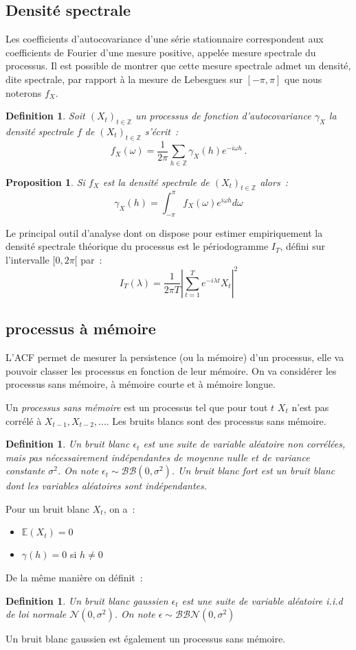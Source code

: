 \documentclass[11pt]{scrartcl} %
\newtheorem{Def}[theorem]{Definition}
\newtheorem{pro}[theorem]{Proposition}
\newcommand{\Xt}{\left(X_t\right)_{t\in\mathbb{Z}}}
\newcommand{\E}[1]{\mathbb{E}\left(#1\right)}
\newcommand{\bb}[1]{\mathcal{BB}\left(0,#1\right)}
\newcommand{\bbn}[1]{\mathcal{BBN}\left(0,#1\right)}
\begin{document}
\subsection{Densité spectrale}
Les coefficients d'autocovariance d'une série stationnaire correspondent aux coefficients de Fourier d'une mesure positive, appelée mesure spectrale du processus. Il est possible de montrer que cette mesure spectrale admet un densité, dite spectrale, par rapport à la mesure de Lebesgues sur $[-\pi,\pi]$ que nous noterons $f_X$.
\begin{Def}
Soit $\Xt$ un processus de fonction d'autocovariance $\gamma_X$ la densité spectrale $f$ de $\Xt$ s'écrit~:
$$
f_X(\omega) = \frac{1}{2\pi}\sum_{h\in\mathbb{Z}}\gamma_X(h)e^{-i\omega h}\,.
$$
\end{Def}
\begin{pro}
Si $f_X$ est la densité spectrale de $\Xt$ alors~:
$$
\gamma_X(h)=\int_{-\pi}^{\pi}f_X(\omega)e^{i\omega h}d\omega
$$
\end{pro}
Le principal outil d'analyse dont on dispose pour estimer empiriquement la densité spectrale théorique du processus est le périodogramme $I_T$, défini sur l'intervalle $[0,2\pi[$ par~:
$$
I_T(\lambda)=\frac{1}{2\pi T}\left|\sum_{t=1}^Te^{-i\lambda t}X_t\right|^2
$$

\subsection{processus à mémoire}
L'ACF permet de mesurer la persistence (ou la mémoire) d'un processus, elle va pouvoir classer les processus en fonction de leur mémoire. On va considérer les processus sans mémoire, à mémoire courte et à mémoire longue.


Un \textit{processus sans mémoire} est un processus tel que pour tout $t$ $X_t$ n'est pas corrélé à $X_{t-1}, X_{t-2},...$. Les bruits blancs sont des processus sans mémoire.


\begin{Def}\label{BB}
Un bruit blanc $\epsilon_t$ est une suite de variable aléatoire non corrélées, mais pas nécessairement indépendantes de moyenne nulle et de variance constante $\sigma^2$. On note $\epsilon_t\sim \bb{\sigma^2}$.
\newline 
Un \textit{bruit blanc fort} est un bruit blanc dont les variables aléatoires sont indépendantes.
\end{Def}
Pour un bruit blanc $X_t$, on a~:
\begin{itemize}
\item $\E{X_t}=0$
\item $\gamma(h)=0$ si $h\not =0$
\end{itemize}
De la même manière on définit~:
\begin{Def}\label{BBG}
Un bruit blanc gaussien $\epsilon_t$ est une suite de variable aléatoire i.i.d de loi normale $\mathcal{N}\left(0,\sigma^2\right)$. On note $\epsilon\sim \bbn{\sigma^2}$
\end{Def}
Un bruit blanc gaussien est également un processus sans mémoire.
\end{document}
